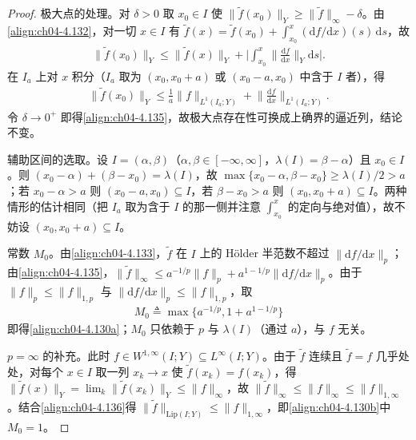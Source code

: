 \documentclass[../../main.tex]{subfiles}%
\begin{document}
\begin{proof}
极大点的处理。对 $\delta>0$ 取 $x_0\in I$ 使 $\|\tilde f(x_0)\|_Y\geqslant\|\tilde f\|_\infty-\delta$。由\eqref{align:ch04-4.132}，对一切 $x\in I$ 有 $\tilde f(x)=\tilde f(x_0)+\int_{x_0}^{x}(\mathrm{d}f/\mathrm{d}x)(s)\,\mathrm{d}s$，故
\begin{align*}
\|\tilde f(x_0)\|_Y\leqslant\|\tilde f(x)\|_Y+\Big|\int_{x_0}^{x}\Big\|\frac{\mathrm{d}f}{\mathrm{d}x}\Big\|_Y\mathrm{d}s\Big| .
\end{align*}
在 $I_a$ 上对 $x$ 积分（$I_a$ 取为 $(x_0,x_0+a)$ 或 $(x_0-a,x_0)$ 中含于 $I$ 者），得
\begin{align*}
\|\tilde f(x_0)\|_Y\leqslant\frac1a\|f\|_{L^1(I_a;Y)}+\Big\|\frac{\mathrm{d}f}{\mathrm{d}x}\Big\|_{L^1(I_a;Y)} .
\end{align*}
令 $\delta\to0^+$ 即得\eqref{align:ch04-4.135}，故极大点存在性可换成上确界的逼近列，结论不变。

辅助区间的选取。设 $I=(\alpha,\beta)$（$\alpha,\beta\in[-\infty,\infty]$，$\lambda(I)=\beta-\alpha$）且 $x_0\in I$。则 $(x_0-\alpha)+(\beta-x_0)=\lambda(I)$，故 $\max\{x_0-\alpha,\beta-x_0\}\geqslant\lambda(I)/2>a$；若 $x_0-\alpha>a$ 则 $(x_0-a,x_0)\subseteq I$，若 $\beta-x_0>a$ 则 $(x_0,x_0+a)\subseteq I$。两种情形的估计相同（把 $I_a$ 取为含于 $I$ 的那一侧并注意 $\int_{x_0}^{x}$ 的定向与绝对值），故不妨设 $(x_0,x_0+a)\subseteq I$。

常数 $M_0$。由\eqref{align:ch04-4.133}，$\tilde f$ 在 $I$ 上的 Hölder 半范数不超过 $\|\mathrm{d}f/\mathrm{d}x\|_p$；由\eqref{align:ch04-4.135}，$\|\tilde f\|_\infty\leqslant a^{-1/p}\|f\|_p+a^{1-1/p}\|\mathrm{d}f/\mathrm{d}x\|_p$。由于 $\|f\|_p\leqslant\|f\|_{1,p}$ 与 $\|\mathrm{d}f/\mathrm{d}x\|_p\leqslant\|f\|_{1,p}$，取
\begin{align*}
M_0\triangleq\max\{a^{-1/p},1+a^{1-1/p}\}
\end{align*}
即得\eqref{align:ch04-4.130a}；$M_0$ 只依赖于 $p$ 与 $\lambda(I)$（通过 $a$），与 $f$ 无关。

$p=\infty$ 的补充。此时 $f\in W^{1,\infty}(I;Y)\subseteq L^\infty(I;Y)$。由于 $\tilde f$ 连续且 $\tilde f=f$ 几乎处处，对每个 $x\in I$ 取一列 $x_k\to x$ 使 $\tilde f(x_k)=f(x_k)$，得 $\|\tilde f(x)\|_Y=\lim_k\|\tilde f(x_k)\|_Y\leqslant\|f\|_\infty$，故 $\|\tilde f\|_\infty\leqslant\|f\|_\infty\leqslant\|f\|_{1,\infty}$。结合\eqref{align:ch04-4.136}得 $\|\tilde f\|_{\mathrm{Lip}(I;Y)}\leqslant\|f\|_{1,\infty}$，即\eqref{align:ch04-4.130b}中 $M_0=1$。
\end{proof}
\end{document}

